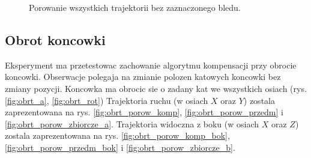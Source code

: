 \begin{figure}
	\centering
	\hfill
	\caption{Porowanie wszystkich trajektorii bez zaznaczonego bledu.}
	\label{fig:do_przodu_porow_zbiorcze}
\end{figure}


\subsection{Obrot koncowki}

Eksperyment ma przetestowac zachowanie algorytmu kompensacji przy obrocie koncowki. Obserwacje polegaja na zmianie polozen katowych koncowki bez zmiany pozycji. Koncowka ma obrocic sie o zadany kat we wszystkich osiach (rys.\ref{fig:obrt_a}, \ref{fig:obrt_rot}) Trajektoria ruchu (w osiach $X$ oraz $Y$) zostala zaprezentowana na rys. \ref{fig:obrt_porow_komp}, \ref{fig:obrt_porow_przedm} i \ref{fig:obrt_porow_zbiorcze_a}. Trajektoria widoczna z boku (w osiach $X$ oraz $Z$) zostala zaprezentowana na rys. \ref{fig:obrt_porow_komp_bok}, \ref{fig:obrt_porow_przedm_bok} i \ref{fig:obrt_porow_zbiorcze_b}.

